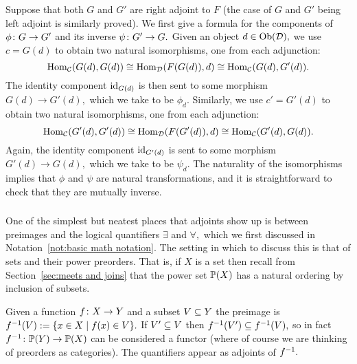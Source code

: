 \documentclass[../main/CT4S-EN-RU]{subfiles}
\begin{document}
\begin{proofENG}
Suppose that both $G$ and $G'$ are right adjoint to $F$ (the case of $G$ and $G'$ being left adjoint is similarly proved). We first give a formula for the components of $\phi\taking G\to G'$ and its inverse $\psi\taking G'\to G.$ Given an object $d\in\Ob(\mcD),$ we use $c=G(d)$ to obtain two natural isomorphisms, one from each adjunction: 
$$\Hom_\mcC(G(d),G(d))\iso\Hom_\mcD(F(G(d)),d)\iso\Hom_\mcC(G(d),G'(d)).$$
The identity component $\id_{G(d)}$ is then sent to some morphism $G(d)\to G'(d),$ which we take to be $\phi_d.$ Similarly, we use $c'=G'(d)$ to obtain two natural isomorphisms, one from each adjunction:
$$\Hom_\mcC(G'(d),G'(d))\iso\Hom_\mcD(F(G'(d)),d)\iso\Hom_\mcC(G'(d),G(d)).$$
Again, the identity component $\id_{G'(d)}$ is sent to some morphism $G'(d)\to G(d),$ which we take to be $\psi_d.$ The naturality of the isomorphisms implies that $\phi$ and $\psi$ are natural transformations, and it is straightforward to check that they are mutually inverse.
\end{proofENG}

\begin{proofRUS}
\end{proofRUS}


\subsubsection{}

\begin{blockENG}
One of the simplest but neatest places that adjoints show up is between preimages and the logical quantifiers $\exists$ and $\forall,$ which we first discussed in Notation~\ref{not:basic math notation}.  The setting in which to discuss this is that of sets and their power preorders. That is, if $X$ is a set then recall from Section~\ref{sec:meets and joins} that the power set $\PP(X)$ has a natural ordering by inclusion of subsets. 
\end{blockENG}

\begin{blockRUS}
\end{blockRUS}

\begin{blockENG}
Given a function $f\taking X\to Y$ and a subset $V\ss Y$ the preimage is $f^\m1(V):=\{x\in X\|f(x)\in V\}.$ If $V'\ss V$ then $f^\m1(V')\ss f^\m1(V),$ so in fact $f^\m1\taking\PP(Y)\to\PP(X)$ can be considered a functor (where of course we are thinking of preorders as categories). The quantifiers appear as adjoints of $f^\m1.$
\end{blockENG}
\end{document}
